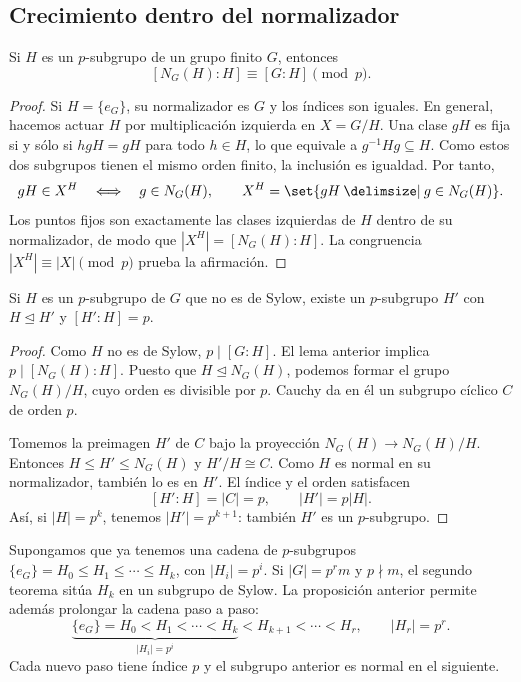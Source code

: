 \subsection{Crecimiento dentro del normalizador}\label{tema:7-2-2}
\begin{lema}\label{lema:C7-normalizador}
Si $H$ es un $p$-subgrupo de un grupo finito $G$, entonces
\[
[N_G(H):H]\equiv[G:H]\pmod p.
\]
\end{lema}
\begin{proof}
Si $H=\{e_G\}$, su normalizador es $G$ y los índices son iguales. En general, hacemos actuar $H$ por multiplicación izquierda en $X=G/H$. Una clase $gH$ es fija si y sólo si $hgH=gH$ para todo $h\in H$, lo que equivale a $g^{-1}Hg\subseteq H$. Como estos dos subgrupos tienen el mismo orden finito, la inclusión es igualdad. Por tanto,
\[
gH\in X^H\quad\Longleftrightarrow\quad g\in N_G(H),\qquad
X^H=\set{gH\given g\in N_G(H)}.
\]
Los puntos fijos son exactamente las clases izquierdas de $H$ dentro de su normalizador, de modo que $|X^H|=[N_G(H):H]$. La congruencia $|X^H|\equiv|X|\pmod p$ prueba la afirmación.
\end{proof}

\begin{prop}\label{prop:C7-crecimiento}
Si $H$ es un $p$-subgrupo de $G$ que no es de Sylow, existe un $p$-subgrupo $H'$ con $H\trianglelefteq H'$ y $[H':H]=p$.
\end{prop}
\begin{proof}
Como $H$ no es de Sylow, $p\mid[G:H]$. El lema anterior implica $p\mid[N_G(H):H]$. Puesto que $H\trianglelefteq N_G(H)$, podemos formar el grupo $N_G(H)/H$, cuyo orden es divisible por $p$. Cauchy da en él un subgrupo cíclico $C$ de orden $p$.

Tomemos la preimagen $H'$ de $C$ bajo la proyección $N_G(H)\to N_G(H)/H$. Entonces $H\le H'\le N_G(H)$ y $H'/H\cong C$. Como $H$ es normal en su normalizador, también lo es en $H'$. El índice y el orden satisfacen
\[
[H':H]=|C|=p,\qquad |H'|=p|H|.
\]
Así, si $|H|=p^k$, tenemos $|H'|=p^{k+1}$: también $H'$ es un $p$-subgrupo.
\end{proof}

Supongamos que ya tenemos una cadena de $p$-subgrupos $\{e_G\}=H_0\le H_1\le\cdots\le H_k$, con $|H_i|=p^i$. Si $|G|=p^r m$ y $p\nmid m$, el segundo teorema sitúa $H_k$ en un subgrupo de Sylow. La proposición anterior permite además prolongar la cadena paso a paso:
\[
\underbrace{\{e_G\}=H_0<H_1<\cdots<H_k}_{|H_i|=p^i}
<H_{k+1}<\cdots<H_r,\qquad |H_r|=p^r.
\]
Cada nuevo paso tiene índice $p$ y el subgrupo anterior es normal en el siguiente.

